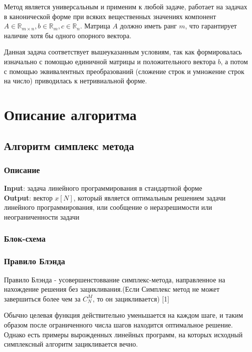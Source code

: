 \documentclass{article}
\begin{document}
    Метод является универсальным и применим к любой задаче, работает на задачах в канонической форме при всяких вещественных значениях компонент $ A \in \mathbb{R}_{m\times{n}}, b \in \mathbb{R}_{m}, c \in \mathbb{R}_n $.
	Матрица $A$ должно иметь ранг $m$, что гарантирует наличие хотя бы одного опорного вектора.

    Данная задача соответствует вышеуказанным условиям, так как формировалась изначально с помощью единичной матрицы и положительного вектора $b$, а потом с помощью эквивалентных преобразований (сложение строк и умножение строк на число) приводилась к нетривиальной форме.
	\section{Описание алгоритма}
    \subsection{Алгоритм симплекс метода}
    \subsubsection{Описание}
    \textbf{Input}: задача линейного программирования
			в стандартной форме\\
    \textbf{Output}: вектор $x[N]$, который является оптимальным решением задачи линейного программирования, или сообщение о неразрешимости или неограниченности задачи
    \subsubsection{Блок-схема}
    \begin{center}
         
    \end{center}
    \subsubsection{Правило Блэнда}
    Правило Блэнда - усовершенстоввание симплекс-метода, направленное на нахождение решения без зацикливания.(Если Симплекс метод не может завершиться более чем за $C^M_{N}$, то он зацикливается) [1]

    Обычно целевая функция действительно уменьшается на каждом шаге, и таким образом после ограниченного числа шагов находится оптимальное решение. Однако есть примеры вырожденных линейных программ, на которых исходный симплексный алгоритм зацикливается вечно.
\end{document}
